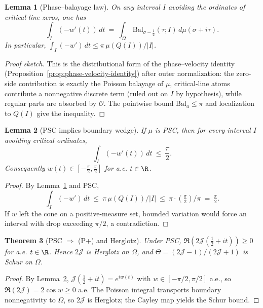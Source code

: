 \documentclass[11pt]{article}
\newtheorem{theorem}{Theorem}
\newtheorem{lemma}[theorem]{Lemma}
\theoremstyle{remark}
\begin{document}
\begin{lemma}[Phase--balayage law]\label{lem:balayage-law}
On any interval \(I\) avoiding the ordinates of critical-line zeros, one has
\[
 \int_I (-w'(t))\,dt\ =\ \int_{\Omega}\, \mathrm{Bal}_{\sigma-\frac12}(\tau;I)\, d\mu(\sigma+i\tau).
\]
In particular, \(\int_I (-w')\,dt\le \pi\, \mu(Q(I))/|I|\).
\end{lemma}
\begin{proof}[Proof sketch]
This is the distributional form of the phase--velocity identity (Proposition~\ref{prop:phase-velocity-identity}) after outer normalization: the zero-side contribution is exactly the Poisson balayage of \(\mu\), critical-line atoms contribute a nonnegative discrete term (ruled out on \(I\) by hypothesis), while regular parts are absorbed by \(\mathcal O\). The pointwise bound \(\mathrm{Bal}_a\le\pi\) and localization to \(Q(I)\) give the inequality.
\end{proof}
\begin{lemma}[PSC implies boundary wedge]\label{lem:wedge-PSC}
If \(\mu\) is PSC, then for every interval \(I\) avoiding critical ordinates,
\[\int_I (-w'(t))\,dt\ \le\ \frac{\pi}{2}.\]
Consequently \(w(t)\in[-\tfrac{\pi}{2},\tfrac{\pi}{2}]\) for a.e. \(t\in\R\).
\end{lemma}
\begin{proof}
By Lemma~\ref{lem:balayage-law} and PSC,
\[\int_I (-w')\,dt\ \le\ \pi\,\mu(Q(I))/|I|\ \le\ \pi\cdot(\tfrac{\pi}{2})/\pi\ =\ \tfrac{\pi}{2}.
\]
If \(w\) left the cone on a positive-measure set, bounded variation would force an interval with drop exceeding \(\pi/2\), a contradiction.
\end{proof}

\begin{theorem}[PSC \(\Rightarrow\) (P+) and Herglotz]\label{thm:PSC-Pplus}
Under PSC, \(\Re(2\mathcal J(\tfrac12+it))\ge 0\) for a.e. \(t\in\R\). Hence \(2\mathcal J\) is Herglotz on \(\Omega\), and \(\Theta=(2\mathcal J-1)/(2\mathcal J+1)\) is Schur on \(\Omega\).
\end{theorem}
\begin{proof}
By Lemma~\ref{lem:wedge-PSC}, \(\mathcal J(\tfrac12+it)=e^{iw(t)}\) with \(w\in[-\pi/2,\pi/2]\) a.e., so \(\Re(2\mathcal J)=2\cos w\ge 0\) a.e.
The Poisson integral transports boundary nonnegativity to \(\Omega\), so \(2\mathcal J\) is Herglotz; the Cayley map yields the Schur bound.
\end{proof}
\end{document}
